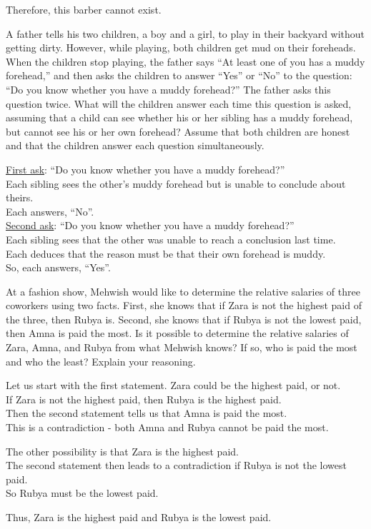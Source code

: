 \documentclass[a4paper]{exam}
\begin{document}
\begin{questions}
\begin{solution}
    Therefore, this barber cannot exist.
  \end{solution}
  
  \question A father tells his two children, a boy and a girl, to play in their backyard without getting dirty. However, while playing, both children get mud on their foreheads. When the children stop playing, the father says ``At least one of you has a muddy forehead,'' and then asks the children to answer ``Yes'' or ``No'' to the question: ``Do you know whether you have a muddy forehead?'' The father asks this question twice. What will the children answer each time this question is asked, assuming that a child can see whether his or her sibling has a muddy forehead, but cannot see his or her own forehead? Assume that both children are honest and that the children answer each question simultaneously.
  \begin{solution}
    \underline{First ask}: ``Do you know whether you have a muddy forehead?''\\
    Each sibling sees the other's muddy forehead but is unable to conclude about theirs.\\
    Each answers, ``No''.\\
    \underline{Second ask}: ``Do you know whether you have a muddy forehead?''\\
    Each sibling sees that the other was unable to reach a conclusion last time.\\
    Each deduces that the reason must be that their own forehead is muddy.\\
    So, each answers, ``Yes''.
  \end{solution}
  
  \question At a fashion show, Mehwish would like to determine the relative salaries of three coworkers using two facts. First, she knows that if Zara is not the highest paid of the three, then Rubya is. Second, she knows that if Rubya is not the lowest paid, then Amna is paid the most. Is it possible to determine the relative salaries of Zara, Amna, and Rubya from what Mehwish knows? If so, who is paid the most and who the least? Explain your reasoning.
  \begin{solution}
    Let us start with the first statement. Zara could be the highest paid, or not.\\
    If Zara is not the highest paid, then Rubya is the highest paid.\\
    Then the second statement tells us that Amna is paid the most.\\
    This is a contradiction - both Amna and Rubya cannot be paid the most.

    The other possibility is that Zara is the highest paid.\\
    The second statement then leads to a contradiction if Rubya is not the lowest paid.\\
    So Rubya must be the lowest paid.

    Thus, Zara is the highest paid and Rubya is the lowest paid.
  \end{solution}
\end{questions}
\end{document}
